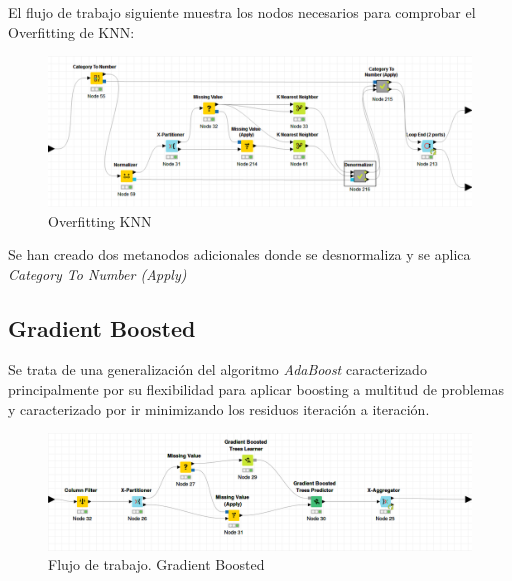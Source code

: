 	\begin{table}[h]
	\end{table}


	El flujo de trabajo siguiente muestra los nodos necesarios para comprobar el Overfitting de KNN:

	\begin{figure}[H]
		\centering
		\includegraphics[width=1\textwidth]{img/knnover.png}
		\caption{Overfitting KNN}
	\end{figure}

	Se han creado dos metanodos adicionales donde se desnormaliza y se aplica \textit{Category To Number (Apply)}
	

	\subsection{Gradient Boosted}
	\hspace{1cm} Se trata de una generalización del algoritmo \textit{AdaBoost} caracterizado principalmente por su flexibilidad para aplicar boosting a multitud de problemas y caracterizado por ir minimizando los residuos iteración a iteración.
	
	
	
	\begin{figure}[H]
		    \centering
			\includegraphics[width=1\textwidth]{img/Gradient.png}
			\caption{Flujo de trabajo. Gradient Boosted}
		\end{figure}
	
